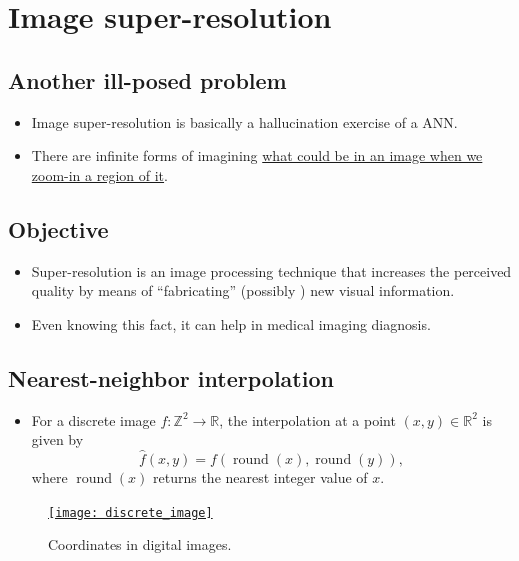 \chapter{Image super-resolution}

\section{Another ill-posed problem}
\begin{itemize}
\item Image super-resolution is basically a hallucination exercise of
  a \gls{ANN}.
\item There are infinite forms of imagining
  \href{https://en.wikipedia.org/wiki/Super-resolution_imaging}{what
    could be in an image when we zoom-in a region of it}.
\end{itemize}

\section{Objective}
\begin{itemize}
\item Super-resolution is an image processing technique that
  increases the perceived quality by means of ``fabricating''
  (possibly ) new visual information.
\item Even knowing this fact, it can help in medical imaging
  diagnosis.
\end{itemize}

\section{Nearest-neighbor interpolation \texorpdfstring{\cite{gonzalez2009digital}}{}}
\begin{itemize}
\item For a discrete image $f: \mathbb{Z}^2 \to \mathbb{R}$, the interpolation at a point 
$(x,y) \in \mathbb{R}^2$ is given by
\begin{equation}
\hat{f}(x,y) = f\!\left( \operatorname{round}(x), \operatorname{round}(y) \right),
\end{equation}
where $\operatorname{round}(x)$ returns the nearest integer value of $x$.
\end{itemize}

\begin{figure}[H]
  \vspace{-2ex}
  \centering
  \href{https://www.mrecacademics.com/DepartmentStudyMaterials/20201220-Digital%20Image%20Processing%20Notes.pdf}{\texttt{[image: discrete\_image]}}
  \caption{Coordinates in digital images.}
  \label{fig:digital_image}
\end{figure}


